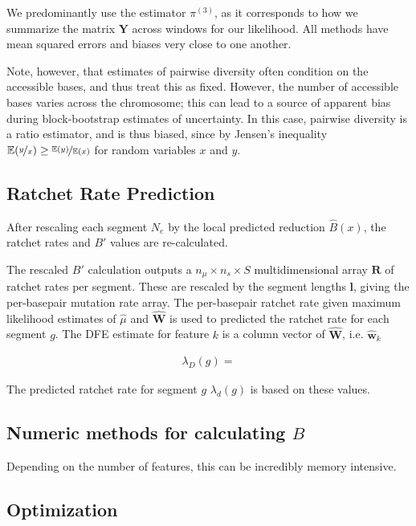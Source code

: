 \documentclass[11pt]{article}
\newcommand{\E}{\mathbb{E}}
\begin{document}
We predominantly use the estimator $\pi^{(3)}$, as it corresponds to how we
summarize the matrix $\mathbf{Y}$ across windows for our likelihood. All
methods have mean squared errors and biases very close to one another.

Note, however, that estimates of pairwise diversity often condition on the
accessible bases, and thus treat this as fixed. However, the number of
accessible bases varies across the chromosome; this can lead to a source of
apparent bias during block-bootstrap estimates of uncertainty.  In this case,
pairwise diversity is a ratio estimator, and is thus biased, since by Jensen's
inequality $\E(\nicefrac{y}{x}) \ge \nicefrac{\E(y)}{\E(x)}$ for random
variables $x$ and $y$. 

\subsection{Ratchet Rate Prediction}

After rescaling each segment $N_e$ by the local predicted reduction
$\hat{B}(x)$, the ratchet rates and $B'$ values are re-calculated. 

The rescaled $B'$ calculation outputs a $n_\mu \times n_s \times S$
multidimensional array $\mathbf{R}$ of ratchet rates per segment. These are
rescaled by the segment lengths $\mathbf{l}$, giving the per-basepair mutation
rate array. The per-basepair ratchet rate given maximum likelihood estimates of
$\hat{\mu}$ and $\widehat{\mathbf{W}}$ is used to predicted the ratchet rate
for each segment $g$. The DFE estimate for feature $k$ is a column vector of
$\widehat{\mathbf{W}}$, i.e. $\widehat{\mathbf{w}}_k$

\begin{align}
  \lambda_D(g) = 
\end{align}

The predicted ratchet rate for segment $g$ $\lambda_d(g)$ is based on these
values.
 
\subsection{Numeric methods for calculating $B$}

Depending on the number of features, this can be incredibly memory intensive.

\subsection{Optimization}
\end{document}
